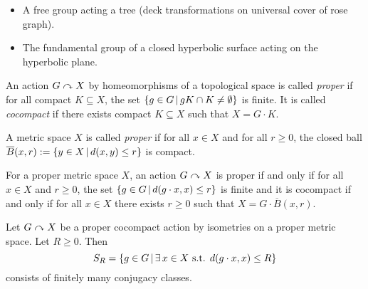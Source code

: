 \begin{example}
    \begin{itemize}
        \item A free group acting a tree (deck transformations on universal cover of rose graph).
        \item The fundamental group of a closed hyperbolic surface acting on the hyperbolic plane.
    \end{itemize}
\end{example}

\begin{definition}
    An action $G \curvearrowright X$ by homeomorphisms of a topological space is called \emph{proper} if for all compact $K \subseteq X$, the set $\left\{ g \in G \,\middle|\, gK \cap K \neq \emptyset \right\}$ is finite.
    It is called \emph{cocompact} if there exists compact $K \subseteq X$ such that $X = G \cdot K$.
\end{definition}

\begin{definition}
    A metric space $X$ is called \emph{proper} if for all $x \in X$ and for all $r \geq 0$, the closed ball $\overline{B}(x, r) := \left\{ y \in X \,\middle|\, d(x, y) \leq r \right\}$ is compact.
\end{definition}

\begin{remark}
    \label{remark:geometric_actions}
    For a proper metric space $X$, an action $G \curvearrowright X$ is proper if and only if for all $x \in X$ and $r \geq 0$, the set $\left\{ g \in G \,\middle|\, d(g \cdot x, x) \leq r \right\}$ is finite and it is cocompact if and only if for all $x \in X$ there exists $r \geq 0$ such that $X = G \cdot \overline{B}(x, r)$.
\end{remark}

\begin{lemma}
    \label{lemma:geometric_action_conjugacy_classes}
    Let $G \curvearrowright X$ be a proper cocompact action by isometries on a proper metric space.
    Let $R \geq 0$.
    Then \[
        S_R = \left\{ g \in G \,\middle|\, \operatorname{\exists} x \in X \text{ s.t. } d(g \cdot x, x) \leq R \right\}
    \] consists of finitely many conjugacy classes.
\end{lemma}

